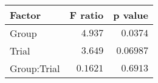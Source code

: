 \begin{tabular}{lrr}
\toprule
      Factor &  F ratio &   p value \\
\midrule
       Group &  $4.937$ &  $0.0374$ \\
       Trial &  $3.649$ & $0.06987$ \\
 Group:Trial & $0.1621$ &  $0.6913$ \\
\bottomrule
\end{tabular}
